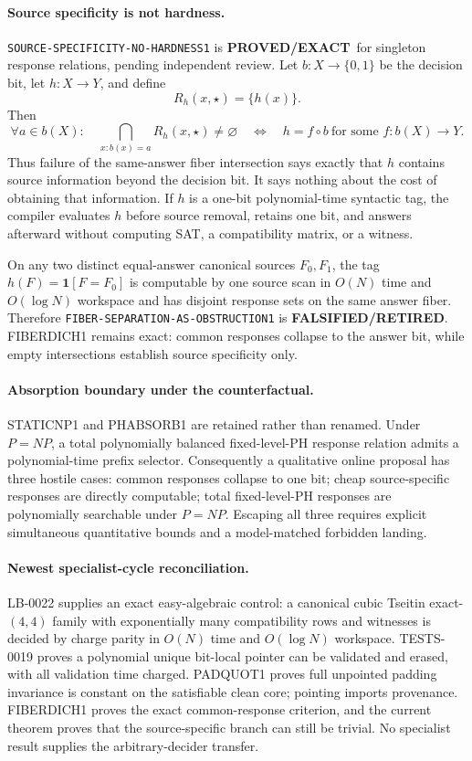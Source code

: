 \documentclass[11pt]{article}
\newcommand{\statusproved}{\textcolor{proved}{\textbf{PROVED/EXACT}}}
\newcommand{\statusretired}{\textcolor{retired}{\textbf{FALSIFIED/RETIRED}}}
\begin{document}
\paragraph{Source specificity is not hardness.}
\texttt{SOURCE-SPECIFICITY-NO-HARDNESS1} is \statusproved\ for singleton
response relations, pending independent review.  Let $b:X\to\{0,1\}$ be the
decision bit, let $h:X\to Y$, and define
\[
 R_h(x,\star)=\{h(x)\}.
\]
Then
\[
 \forall a\in b(X):\quad
 \bigcap_{x:b(x)=a}R_h(x,\star)\ne\varnothing
 \quad\Longleftrightarrow\quad
 h=f\circ b\ \text{for some }f:b(X)\to Y.
\]
Thus failure of the same-answer fiber intersection says exactly that $h$
contains source information beyond the decision bit.  It says nothing about
the cost of obtaining that information.  If $h$ is a one-bit polynomial-time
syntactic tag, the compiler evaluates $h$ before source removal, retains one
bit, and answers afterward without computing SAT, a compatibility matrix, or
a witness.

On any two distinct equal-answer canonical sources $F_0,F_1$, the tag
$h(F)=\mathbf1[F=F_0]$ is computable by one source scan in $O(N)$ time and
$O(\log N)$ workspace and has disjoint response sets on the same answer
fiber.  Therefore \texttt{FIBER-SEPARATION-AS-OBSTRUCTION1} is
\statusretired.  FIBERDICH1 remains exact: common responses collapse to the
answer bit, while empty intersections establish source specificity only.

\paragraph{Absorption boundary under the counterfactual.}
STATICNP1 and PHABSORB1 are retained rather than renamed.  Under $P=NP$, a
total polynomially balanced fixed-level-PH response relation admits a
polynomial-time prefix selector.  Consequently a qualitative online proposal
has three hostile cases: common responses collapse to one bit; cheap
source-specific responses are directly computable; total fixed-level-PH
responses are polynomially searchable under $P=NP$.  Escaping all three
requires explicit simultaneous quantitative bounds and a model-matched
forbidden landing.

\paragraph{Newest specialist-cycle reconciliation.}
LB-0022 supplies an exact easy-algebraic control: a canonical cubic Tseitin
exact-$(4,4)$ family with exponentially many compatibility rows and witnesses
is decided by charge parity in $O(N)$ time and $O(\log N)$ workspace.
TESTS-0019 proves a polynomial unique bit-local pointer can be validated and
erased, with all validation time charged.  PADQUOT1 proves full unpointed
padding invariance is constant on the satisfiable clean core; pointing imports
provenance.  FIBERDICH1 proves the exact common-response criterion, and the
current theorem proves that the source-specific branch can still be trivial.
No specialist result supplies the arbitrary-decider transfer.
\end{document}
